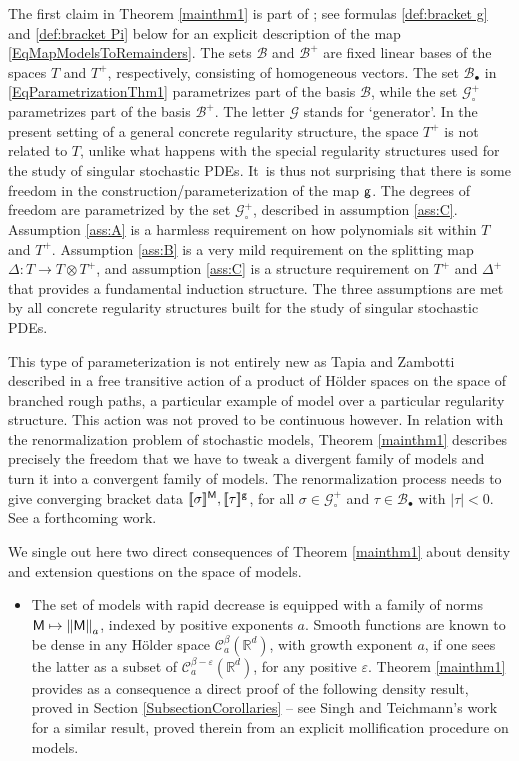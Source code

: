 \documentclass[10pt]{amsart}
\newcommand\mto{\mathchoice{\longmapsto}{\mapsto}{\mapsto}{\mapsto}}
\newcommand{\sbullet}{{\scriptscriptstyle\bullet}}
\theoremstyle{plain}
\theoremstyle{definition}
\newcommand{\Brac}[1]{[\![#1]\!]}
\let\epsilon\varepsilon
\newcommand{\bbR}{\mathbb{R}}
\newcommand{\mcB}{\mathcal{B}}
\newcommand{\mcC}{\mathcal{C}}
\newcommand{\mcG}{\mathcal{G}}
\begin{document}
The first claim in Theorem \ref{mainthm1} is part of \cite[Th.\,21]{BH}; see formulas \eqref{def:bracket g} and \eqref{def:bracket Pi} below for an explicit description of the map \eqref{EqMapModelsToRemainders}. The sets $\mcB$ and $\mcB^+$ are fixed linear bases of the spaces $T$ and $T^+$, respectively, consisting of homogeneous vectors. The set $\mcB_\sbullet$ in \eqref{EqParametrizationThm1} parametrizes part of the basis $\mcB$, while the set $\mcG_\circ^+$ parametrizes part of the basis $\mcB^+$. The letter $\mcG$ stands for `generator'. In the present setting of a general concrete regularity structure, the space $T^+$ is not related to $T$, unlike what happens with the special regularity structures used for the study of singular stochastic PDEs. It~is thus not surprising that there is some freedom in the construction/parameterization of the map $\sf g$. The degrees of freedom are parametrized by the set $\mcG^+_\circ$, described in assumption \eqref{ass:C}. Assumption \eqref{ass:A} is a harmless requirement on how polynomials sit within $T$ and $T^+$. Assumption \eqref{ass:B} is a very mild requirement on the splitting map $\Delta : T\to T\otimes T^+$, and assumption \eqref{ass:C} is a structure requirement on $T^+$ and $\Delta^+$ that provides a fundamental induction structure. The three assumptions are met by all concrete regularity structures built for the study of singular stochastic PDEs.

This type of parameterization is not entirely new as Tapia and Zambotti described in \cite{TZ18} a free transitive action of a product of Hölder spaces on the space of branched rough paths, a particular example of model over a particular regularity structure. This action was not proved to be continuous however. In relation with the renormalization problem of stochastic models, Theorem \ref{mainthm1} describes precisely the freedom that we have to tweak a divergent family of models and turn it into a convergent family of models. The renormalization process needs to give converging bracket data $\Brac{\sigma}^{\sf M}, \Brac{\tau}^{\sf g}$, for all $\sigma\in\mcG_\circ^+$ and $\tau\in\mcB_\sbullet$ with $\vert\tau\vert<0$. See a forthcoming work.

We single out here two direct consequences of Theorem \ref{mainthm1} about density and extension questions on the space of models.

\begin{itemize}
\item
The set of models with rapid decrease is equipped with a family of norms ${\sf M\mto \|M\|}_a$, indexed by positive exponents $a$. Smooth functions are known to be dense in any Hölder space $\mcC^\beta_a(\bbR^d)$, with growth exponent $a$, if one sees the latter as a subset of $\mcC^{\beta-\epsilon}_a(\bbR^d)$, for any positive $\epsilon$. Theorem \ref{mainthm1} provides as a consequence a direct proof of the following density result, proved in Section \ref{SubsectionCorollaries} -- see Singh and Teichmann's work \cite{SinghTeichmann} for a similar result, proved therein from an explicit mollification procedure on models.
\end{itemize}
\end{document}
